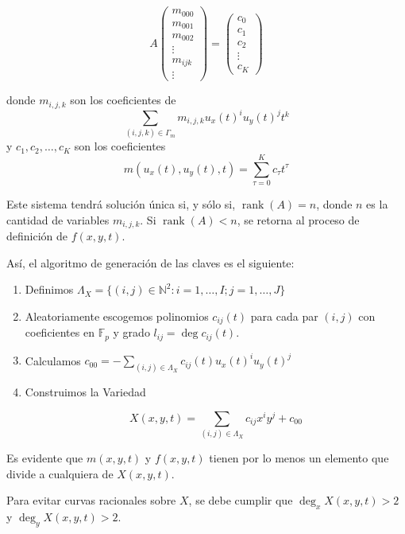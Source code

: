 \documentclass[12pt]{article}
\newcommand{\rank}{\operatorname{rank}}
\begin{document}
\[ A \left( \begin{array}{c}
m_{000}\\
m_{001} \\
m_{002}\\
\vdots\\
m_{ijk}\\
\vdots  \end{array} \right) = 
\left( \begin{array}{c}
c_0\\
c_1 \\
c_2\\
\vdots \\
c_K \end{array} \right)\] 

donde  $m_{i,j,k} $ son los coeficientes de 
$$\sum_{(i,j,k)\in\Gamma_m}m_{i,j,k} u_x(t)^i u_y(t)^j t^k $$
y $ c_1, c_2, \ldots,  c_K$ son los coeficientes
$$m(u_x (t), u_y (t), t) = \sum_{\tau=0}^{K}c_{\tau} t^{\tau}$$


Este sistema tendr\'a soluci\'on \'unica si, y s\'olo si, $\rank(A) = n$, donde $n$ es la cantidad de variables $m_{i,j,k} $. Si $\rank(A) <n$, se retorna al proceso de definici\'on de $f(x,y,t)$.


 As\'i, el algoritmo de generaci\'on de las claves es el siguiente:


 \begin{enumerate}
 \item Definimos $\Lambda_X = \{(i, j) \in \mathbb{N}^2 : i = 1,\ldots, I; j = 1, \ldots , J\}$
 
\item Aleatoriamente escogemos polinomios $c_{ij} (t)$ para cada par $(i, j)$ con coeficientes en  $\mathbb{F}_p$ y grado $l_{ij} = \deg c_{ij} (t)$.

\item Calculamos
$c_{00} = -\sum_{(i,j)\in\Lambda_X}c_{ij} (t)u_x (t)^i u_y (t)^j$

\item Construimos la Variedad

$$X(x, y, t) =\sum_{(i,j)\in\Lambda_X} c_{ij} x^i y^j + c_{00}$$
\end{enumerate}

Es evidente que  $m(x,y,t)$ y $f(x,y,t)$ tienen por lo menos un elemento que divide a cualquiera de $X(x,y,t)$. 

Para evitar curvas racionales sobre $X$, se debe cumplir que $\deg_x X(x,y,t) > 2$ y $\deg_y X(x,y,t) > 2$. 
\end{document}
